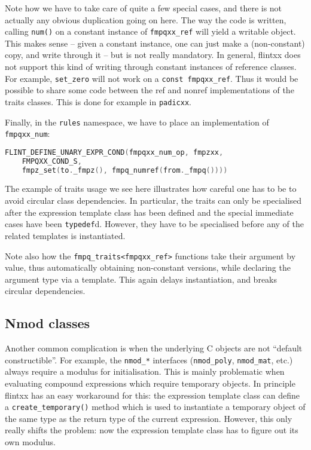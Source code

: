 \documentclass[a4paper,10pt]{book}
\newcommand{\code}{\lstinline}
\begin{document}
{{Note how we have to take care of quite a few special cases, and there is not
actually any obvious duplication going on here. The way the code is written,
calling \code{num()} on a constant instance of \code{fmpqxx_ref} will yield a
writable object. This makes sense -- given a constant instance, one can just
make a (non-constant) copy, and write through it -- but is not really mandatory.
In
general, flintxx does not support this kind of writing through constant
instances of reference classes.
For example, \code{set_zero} will not work on a \code{const fmpqxx_ref}.
Thus it would be possible to share some code between the ref and
nonref implementations of the traits classes. This is done for example in
\code{padicxx}.

Finally, in the \code{rules} namespace, we have to place an implementation of
\code{fmpqxx_num}:

\begin{lstlisting}[language=c++]
FLINT_DEFINE_UNARY_EXPR_COND(fmpqxx_num_op, fmpzxx,
    FMPQXX_COND_S,
    fmpz_set(to._fmpz(), fmpq_numref(from._fmpq())))
\end{lstlisting}

The example of traits usage we see here illustrates how careful one has to be to
avoid circular class dependencies. In particular, the traits can only be
specialised after the expression template class has been defined and the special
immediate cases have been \code{typedef}d. However, they have to be specialised
before any of the related templates is instantiated.

Note also how the \code{fmpq_traits<fmpqxx_ref>} functions take their argument
by value, thus automatically obtaining non-constant versions, while declaring
the argument type via a template. This again delays instantiation, and breaks
circular dependencies.

\subsection{Nmod classes}

Another common complication is when the underlying C objects are not ``default
constructible''. For example, the \code{nmod_*} interfaces (\code{nmod_poly},
\code{nmod_mat}, etc.) always require a modulus for initialisation. This is
mainly problematic when evaluating compound expressions which require temporary
objects. In principle flintxx has an easy workaround for this: the expression
template class can define a \code{create_temporary()} method which is used to
instantiate a temporary object of the same type as the return type of the
current expression. However, this only really shifts the problem: now the
expression template class has to figure out its own modulus.

}}
\end{document}
